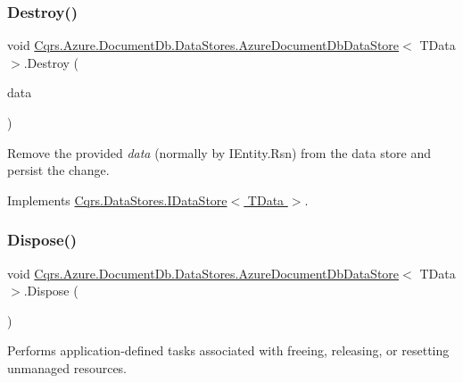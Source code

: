 \subsubsection{\texorpdfstring{Destroy()}{Destroy()}}
{\footnotesize\ttfamily void \hyperlink{classCqrs_1_1Azure_1_1DocumentDb_1_1DataStores_1_1AzureDocumentDbDataStore}{Cqrs.\+Azure.\+Document\+Db.\+Data\+Stores.\+Azure\+Document\+Db\+Data\+Store}$<$ T\+Data $>$.Destroy (\begin{DoxyParamCaption}\item[{T\+Data}]{data }\end{DoxyParamCaption})}



Remove the provided {\itshape data}  (normally by I\+Entity.\+Rsn) from the data store and persist the change. 



Implements \hyperlink{interfaceCqrs_1_1DataStores_1_1IDataStore_aa7ade96f2f3151d5353cf7bdbb2baec5_aa7ade96f2f3151d5353cf7bdbb2baec5}{Cqrs.\+Data\+Stores.\+I\+Data\+Store$<$ T\+Data $>$}.

\mbox{\label{classCqrs_1_1Azure_1_1DocumentDb_1_1DataStores_1_1AzureDocumentDbDataStore_ade945ac02451a490711367dbe54d4132_ade945ac02451a490711367dbe54d4132}} 
\subsubsection{\texorpdfstring{Dispose()}{Dispose()}}
{\footnotesize\ttfamily void \hyperlink{classCqrs_1_1Azure_1_1DocumentDb_1_1DataStores_1_1AzureDocumentDbDataStore}{Cqrs.\+Azure.\+Document\+Db.\+Data\+Stores.\+Azure\+Document\+Db\+Data\+Store}$<$ T\+Data $>$.Dispose (\begin{DoxyParamCaption}{ }\end{DoxyParamCaption})}



Performs application-\/defined tasks associated with freeing, releasing, or resetting unmanaged resources. 

